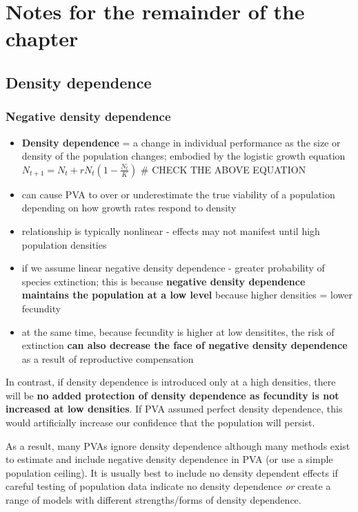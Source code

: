 \documentclass[]{article}
\begin{document}
\section{Notes for the remainder of the
chapter}\label{notes-for-the-remainder-of-the-chapter}

\subsection{Density dependence}\label{density-dependence}

\subsubsection{Negative density
dependence}\label{negative-density-dependence}

\begin{itemize}
\item
  \textbf{Density dependence} = a change in individual performance as
  the size or density of the population changes; embodied by the
  logistic growth equation \(N_{t+1} = N_t + rN_t(1-\frac{N_t}{K})\) \#
  CHECK THE ABOVE EQUATION
\item
  can cause PVA to over or underestimate the true viability of a
  population depending on how growth rates respond to density
\item
  relationship is typically nonlinear - effects may not manifest until
  high population densities
\item
  if we assume linear negative density dependence - greater probability
  of species extinction; this is because \textbf{negative density
  dependence maintains the population at a low level} because higher
  densities = lower fecundity
\item
  at the same time, because fecundity is higher at low densitites, the
  risk of extinction \textbf{can also decrease the face of negative
  density dependence} as a result of reproductive compensation
\end{itemize}

In contrast, if density dependence is introduced only at a high
densities, there will be \textbf{no added protection of density
dependence as fecundity is not increased at low densities}. If PVA
assumed perfect density dependence, this would artificially increase our
confidence that the population will persist.

As a result, many PVAs ignore density dependence although many methods
exist to estimate and include negative density dependence in PVA (or use
a simple population ceiling). It is usually best to include no density
dependent effects if careful testing of population data indicate no
density dependence \emph{or} create a range of models with different
strengths/forms of density dependence.
\end{document}
